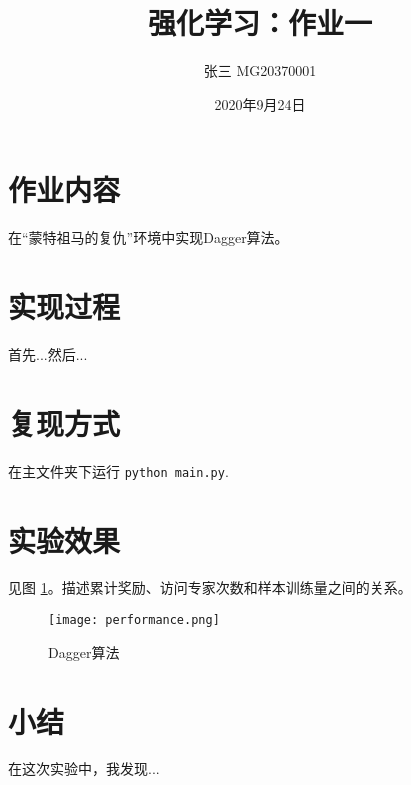 \documentclass[a4paper,12pt]{article}
\begin{document}
\title{强化学习：作业一}

\author{张三 MG20370001}

\date{2020年9月24日}

\maketitle

\section{作业内容}
在“蒙特祖马的复仇”环境中实现Dagger算法。

\section{实现过程}

首先...然后...

\section{复现方式}
在主文件夹下运行 \texttt{python main.py}.
\section{实验效果}
见图 \ref{performance}。描述累计奖励、访问专家次数和样本训练量之间的关系。
\begin{figure}[h!]
\centering
\texttt{[image: performance.png]}
\caption{Dagger算法}
\label{performance}
\end{figure}
\section{小结}
在这次实验中，我发现...
\end{document}
